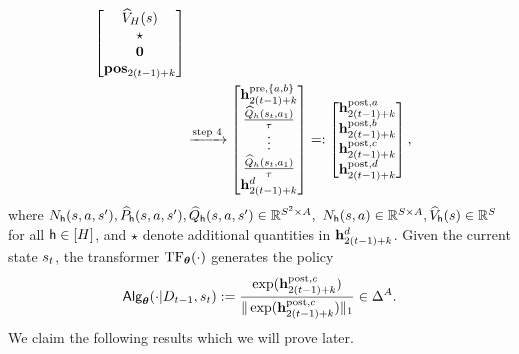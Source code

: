 \begin{align}
\begin{bmatrix}
         {\widehat{{{V}}}}_{{H}}({s})  \\ \star
        \\ {\mathbf 0} \\{\mathbf{pos}}_{2(t-1)+k}
\end{bmatrix}\notag\\
&
\xrightarrow{\text{step 4}}
\begin{bmatrix}
    {\mathbf h}_{2(t-1)+k}^{{\mathrm{pre}},\{{a},{b}\}}\\ \frac{{\widehat{{Q}}}_h({s}_t,{a}_1)}{{\tau}}\\\vdots\\
\frac{{\widehat{{Q}}}_h({s}_t,{a}_1)}{{\tau}}
    \\ {\mathbf h}_{2(t-1)+k}^{{d}}
\end{bmatrix}
=:
\begin{bmatrix}
    {\mathbf h}_{2(t-1)+k}^{{\mathrm{post}},{a}} \\  {\mathbf h}_{2(t-1)+k}^{{\mathrm{post}},{b}}\\  {\mathbf h}_{2(t-1)+k}^{{\mathrm{post}},{c}}\\   {\mathbf h}_{2(t-1)+k}^{{\mathrm{post}},{d}}
\end{bmatrix},\label{eq:ucbvi_roadmap}
\end{align}
where ${N}_{{\mathsf{h}}}({s},{a},{s}'),\widehat{P}_{{\mathsf{h}}}({s},{a},{s}'),{\widehat{{Q}}}_{{\mathsf{h}}}({s},{a},{s}')\in\mathbb{R}^{{S}^2\times{A}},~{N}_{{\mathsf{h}}}({s},{a})\in\mathbb{R}^{{S}\times{A}},{\widehat{{{V}}}}_{{\mathsf{h}}}({s})\in\mathbb{R}^{S}$ for all ${\mathsf{h}}\in[{H}]$, and $\star$ denote additional quantities in ${\mathbf h}^{d}_{2(t-1)+k}$. Given the current state ${s}_t$, the transformer ${\rm TF}_{{\boldsymbol \theta}}(\cdot)$ generates the policy $${\mathsf{Alg}}_{{\boldsymbol \theta}}(\cdot|{D}_{t-1},{s}_t):=\frac{\exp({\mathbf h}^{{\mathrm{post}},{c}}_{2(t-1)+k})}{\|\exp({\mathbf h}^{{\mathrm{post}},{c}}_{2(t-1)+k})\|_1}\in\Delta^{A}.$$
We claim the following results which we will prove later.

